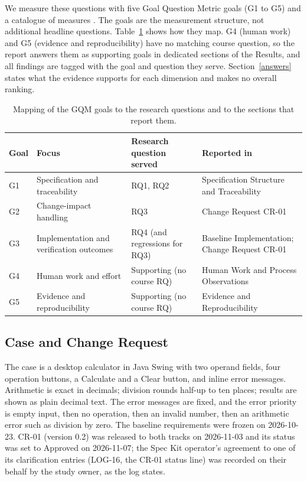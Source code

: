 \documentclass[conference]{IEEEtran}
\begin{document}
We measure these questions with five Goal Question Metric goals (G1 to
G5) and a catalogue of measures \cite{basili1994}. The goals are the
measurement structure, not additional headline questions.
Table~\ref{tbl-rqmap} shows how they map. G4 (human work) and G5
(evidence and reproducibility) have no matching course question, so the
report answers them as supporting goals in dedicated sections of the
Results, and all findings are tagged with the goal and question they
serve. Section~\ref{answers} states what the evidence supports for
each dimension and makes no overall ranking.

\begin{table}[htbp]
\caption{Mapping of the GQM goals to the research questions and to the sections
that report them.}\label{tbl-rqmap}
\centering\footnotesize\setlength{\tabcolsep}{3pt}
\begin{tabular}{>{\raggedright\arraybackslash}p{} >{\raggedright\arraybackslash}p{} >{\raggedright\arraybackslash}p{} >{\raggedright\arraybackslash}p{}}
\hline
\textbf{Goal} & \textbf{Focus} & \textbf{Research question served} & \textbf{Reported in} \\
\hline
G1 & Specification and traceability & RQ1, RQ2 & Specification Structure and Traceability \\
G2 & Change-impact handling & RQ3 & Change Request CR-01 \\
G3 & Implementation and verification outcomes & RQ4 (and regressions for RQ3) & Baseline Implementation; Change Request CR-01 \\
G4 & Human work and effort & Supporting (no course RQ) & Human Work and Process Observations \\
G5 & Evidence and reproducibility & Supporting (no course RQ) & Evidence and Reproducibility \\
\hline
\end{tabular}
\end{table}

\subsection{Case and Change Request}\label{case-and-change-request}

The case is a desktop calculator in Java Swing with two operand fields,
four operation buttons, a Calculate and a Clear button, and inline error
messages. Arithmetic is exact in decimals; division rounds half-up to
ten places; results are shown as plain decimal text. The error messages
are fixed, and the error priority is empty input, then no operation,
then an invalid number, then an arithmetic error such as division by
zero. The baseline requirements were frozen on 2026-10-23. CR-01
(version 0.2) was released to both tracks on 2026-11-03 and its status
was set to Approved on 2026-11-07; the Spec Kit operator's agreement to
one of its clarification entries (LOG-16, the CR-01 status line) was
recorded on their behalf by the study owner, as the log states.
\end{document}
